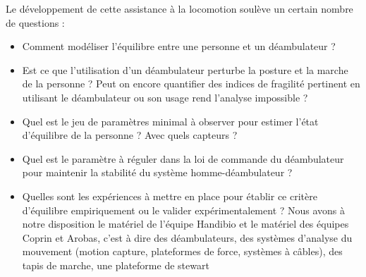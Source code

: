 \documentclass[a4paper, 10pt ]{article}
\begin{document}
Le développement de cette assistance à la locomotion soulève un certain nombre de questions :  
\begin{itemize}


\item Comment modéliser l'équilibre entre une personne et un déambulateur ? %
 
 \item Est ce que l'utilisation d'un déambulateur perturbe la posture et la marche de la personne ? Peut on encore quantifier des indices de fragilité pertinent en utilisant le déambulateur ou son usage rend l'analyse impossible ?

 
 \item Quel est le jeu de paramètres minimal à observer pour estimer l'état d'équilibre de la personne ? Avec quels capteurs ?

\item Quel est le paramètre à réguler dans la loi de commande du déambulateur pour maintenir la stabilité du système homme-déambulateur ?

\item Quelles sont les expériences à mettre en place pour établir ce critère d'équilibre empiriquement ou le valider expérimentalement ? Nous avons à notre disposition le matériel de l'équipe Handibio et le matériel des équipes Coprin et Arobas, c'est à dire des déambulateurs, des systèmes d'analyse du mouvement (motion capture, plateformes de force, systèmes à câbles), des tapis de marche, une plateforme de stewart


\end{itemize}
\end{document}
